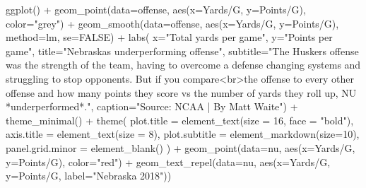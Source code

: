 \documentclass[
  letterpaper,
  DIV=11,
  numbers=noendperiod]{scrreprt}
\newenvironment{Shaded}{\begin{snugshade}}{\end{snugshade}}
\newcommand{\AttributeTok}[1]{\textcolor[rgb]{0.40,0.45,0.13}{#1}}
\newcommand{\ConstantTok}[1]{\textcolor[rgb]{0.56,0.35,0.01}{#1}}
\newcommand{\DecValTok}[1]{\textcolor[rgb]{0.68,0.00,0.00}{#1}}
\newcommand{\FunctionTok}[1]{\textcolor[rgb]{0.28,0.35,0.67}{#1}}
\newcommand{\NormalTok}[1]{\textcolor[rgb]{0.00,0.23,0.31}{#1}}
\newcommand{\SpecialCharTok}[1]{\textcolor[rgb]{0.37,0.37,0.37}{#1}}
\newcommand{\StringTok}[1]{\textcolor[rgb]{0.13,0.47,0.30}{#1}}
\begin{document}
\begin{Shaded}
\begin{Highlighting}[]
\FunctionTok{ggplot}\NormalTok{() }\SpecialCharTok{+} 
  \FunctionTok{geom\_point}\NormalTok{(}\AttributeTok{data=}\NormalTok{offense, }\FunctionTok{aes}\NormalTok{(}\AttributeTok{x=}\StringTok{\textasciigrave{}}\AttributeTok{Yards/G}\StringTok{\textasciigrave{}}\NormalTok{, }\AttributeTok{y=}\StringTok{\textasciigrave{}}\AttributeTok{Points/G}\StringTok{\textasciigrave{}}\NormalTok{), }\AttributeTok{color=}\StringTok{"grey"}\NormalTok{) }\SpecialCharTok{+} 
  \FunctionTok{geom\_smooth}\NormalTok{(}\AttributeTok{data=}\NormalTok{offense, }\FunctionTok{aes}\NormalTok{(}\AttributeTok{x=}\StringTok{\textasciigrave{}}\AttributeTok{Yards/G}\StringTok{\textasciigrave{}}\NormalTok{, }\AttributeTok{y=}\StringTok{\textasciigrave{}}\AttributeTok{Points/G}\StringTok{\textasciigrave{}}\NormalTok{), }\AttributeTok{method=}\NormalTok{lm, }\AttributeTok{se=}\ConstantTok{FALSE}\NormalTok{) }\SpecialCharTok{+} 
  \FunctionTok{labs}\NormalTok{(}
    \AttributeTok{x=}\StringTok{"Total yards per game"}\NormalTok{, }
    \AttributeTok{y=}\StringTok{"Points per game"}\NormalTok{, }
    \AttributeTok{title=}\StringTok{"Nebraska\textquotesingle{}s underperforming offense"}\NormalTok{, }
    \AttributeTok{subtitle=}\StringTok{"The Husker\textquotesingle{}s offense was the strength of the team, having to overcome a defense changing systems and struggling to stop opponents. But if you compare\textless{}br\textgreater{}the offense to every other offense and how many points they score vs the number of yards they roll up, NU *underperformed*."}\NormalTok{, }
    \AttributeTok{caption=}\StringTok{"Source: NCAA | By Matt Waite"}\NormalTok{) }\SpecialCharTok{+} 
  \FunctionTok{theme\_minimal}\NormalTok{() }\SpecialCharTok{+} 
  \FunctionTok{theme}\NormalTok{(}
    \AttributeTok{plot.title =} \FunctionTok{element\_text}\NormalTok{(}\AttributeTok{size =} \DecValTok{16}\NormalTok{, }\AttributeTok{face =} \StringTok{"bold"}\NormalTok{),}
    \AttributeTok{axis.title =} \FunctionTok{element\_text}\NormalTok{(}\AttributeTok{size =} \DecValTok{8}\NormalTok{), }
    \AttributeTok{plot.subtitle =} \FunctionTok{element\_markdown}\NormalTok{(}\AttributeTok{size=}\DecValTok{10}\NormalTok{), }
    \AttributeTok{panel.grid.minor =} \FunctionTok{element\_blank}\NormalTok{()}
\NormalTok{    ) }\SpecialCharTok{+}
  \FunctionTok{geom\_point}\NormalTok{(}\AttributeTok{data=}\NormalTok{nu, }\FunctionTok{aes}\NormalTok{(}\AttributeTok{x=}\StringTok{\textasciigrave{}}\AttributeTok{Yards/G}\StringTok{\textasciigrave{}}\NormalTok{, }\AttributeTok{y=}\StringTok{\textasciigrave{}}\AttributeTok{Points/G}\StringTok{\textasciigrave{}}\NormalTok{), }\AttributeTok{color=}\StringTok{"red"}\NormalTok{) }\SpecialCharTok{+} 
  \FunctionTok{geom\_text\_repel}\NormalTok{(}\AttributeTok{data=}\NormalTok{nu, }\FunctionTok{aes}\NormalTok{(}\AttributeTok{x=}\StringTok{\textasciigrave{}}\AttributeTok{Yards/G}\StringTok{\textasciigrave{}}\NormalTok{, }\AttributeTok{y=}\StringTok{\textasciigrave{}}\AttributeTok{Points/G}\StringTok{\textasciigrave{}}\NormalTok{, }\AttributeTok{label=}\StringTok{"Nebraska 2018"}\NormalTok{))}
\end{Highlighting}
\end{Shaded}
\end{document}
